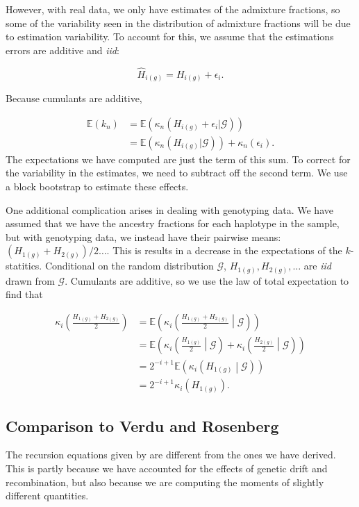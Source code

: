\documentclass[11pt]{amsart}
\begin{document}
However, with real data, we only have estimates of the admixture fractions, so some of the variability seen in the distribution of admixture fractions will be due to estimation variability.
To account for this, we assume that the estimations errors are additive and \textit{iid}:

$$\hat{H}_{i(g)}=H_{i(g)}+\epsilon_i.$$

Because cumulants are additive, 

\begin{align*}
	\mathbb{E}(k_n)&=\mathbb{E}\left(\kappa_n(H_{i(g)}+\epsilon_i|\mathcal{G})\right)\\
	&=\mathbb{E}\left(\kappa_n(H_{i(g)}|\mathcal{G})\right)+\kappa_n(\epsilon_i).
\end{align*}
The expectations we have computed are just the term of this sum.
To correct for the variability in the estimates, we need to subtract off the second term. 
We use a block bootstrap to estimate these effects.

One additional complication arises in dealing with genotyping data. We have assumed that we have the ancestry fractions for each haplotype in the sample, but with genotyping data, we instead have their pairwise means: $(H_{1(g)}+H_{2(g)})/2\dots$.  This is results in a decrease in the expectations of the $k$-statitics. Conditional on the random distribution $\mathcal{G}$, $H_{1(g)},H_{2(g)},\dots$ are \textit{iid} drawn from $\mathcal{G}$.
Cumulants are additive, so we use the law of total expectation to find that

\begin{align*}
	\kappa_i\left(\frac{H_{1(g)}+H_{2(g)}}{2}\right)
		&=\mathbb{E}\left(\kappa_i\left(\frac{H_{1(g)}+H_{2(g)}}{2}\middle\vert\mathcal{G}\right)\right)\\
		&=\mathbb{E}\left(\kappa_i\left(\frac{H_{1(g)}}{2}\middle\vert\mathcal{G}\right)+\kappa_i\left(\frac{H_{2(g)}}{2}\middle\vert\mathcal{G}\right)\right)\\
		&=2^{-i+1}\mathbb{E}\left(\kappa_i\left(H_{1(g)}\middle\vert\mathcal{G}\right)\right)\\
		&=2^{-i+1}\kappa_i\left(H_{1(g)}\right).
\end{align*}

\subsection*{Comparison to Verdu and Rosenberg}
The recursion equations given by \citet{verdu2011general} are different from the ones we have derived. This is partly because we have accounted for the effects of genetic drift and recombination, but also because we are computing the moments of slightly different quantities.
\end{document}
